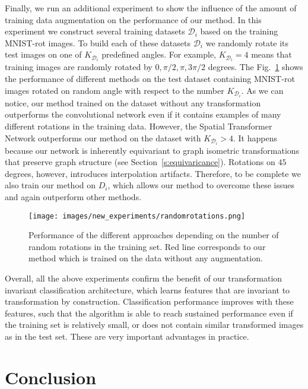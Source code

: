 \documentclass[10pt,journal,compsoc]{IEEEtran}
\begin{document}
	Finally, we run an additional experiment to show the influence of the amount of training data augmentation on the performance of our method. In this experiment we construct several training datasets $\mathcal{D}_i$ based on the training MNIST-rot images. To build each of these datasets $\mathcal{D}_i$ we randomly rotate its test images on one of $K_{\mathcal{D}_i}$ predefined angles. For example, $K_{\mathcal{D}_i}=4$ means that training images are randomly rotated by $0, \pi/2, \pi, 3\pi/2$ degrees. The Fig.~\ref{fig:randomrot} shows the performance of different methods on the test dataset containing MNIST-rot images rotated on random angle with respect to the number $K_{\mathcal{D}_i}$. As we can notice, our method trained on the dataset without any transformation outperforms the convolutional network even if it contains examples of many different rotations in the training data. However, the Spatial Transformer Network outperforms our method on the dataset with $K_{\mathcal{D}_i} > 4$. It happens because our network is inherently equivariant to graph isometric transformations that preserve graph structure (see Section~\ref{s:equivaricance}). Rotations on $45$ degrees, however, introduces interpolation artifacts. 
	Therefore, to be complete we also train our method on $D_i$, which allows our method to overcome these issues and again outperform other methods. 
	
	\begin{figure}[t!]
		\texttt{[image: images/new\_experiments/randomrotations.png]}
		\caption{Performance of the different approaches depending on the number of random rotations in the training set. Red line corresponds to our method which is trained on the data without any augmentation.}
		\label{fig:randomrot}
	\end{figure}
	
	
	Overall, all the above experiments confirm the benefit of our transformation invariant classification architecture, which learns features that are invariant to transformation by construction. Classification performance improves with these features, such that the algorithm is able to reach sustained performance even if the training set is relatively small, or does not contain similar transformed images as in the test set. These are very important advantages in practice.
	
	
	\section{Conclusion}
	\label{s:conclusion}
	
\end{document}

